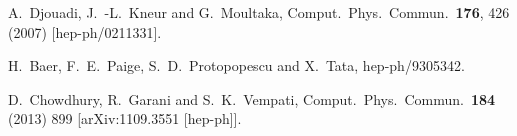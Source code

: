 \documentclass[final,3p,11pt,pdflatex]{elsarticle}
\begin{document}
\begin{thebibliography}{100}
  A.~Djouadi, J.~-L.~Kneur and G.~Moultaka,
  Comput.\ Phys.\ Commun.\  {\bf 176}, 426 (2007)
  [hep-ph/0211331].

  H.~Baer, F.~E.~Paige, S.~D.~Protopopescu and X.~Tata,
  hep-ph/9305342.

  D.~Chowdhury, R.~Garani and S.~K.~Vempati,
  Comput.\ Phys.\ Commun.\  {\bf 184} (2013) 899
  [arXiv:1109.3551 [hep-ph]].


\end{thebibliography}
\end{document}
